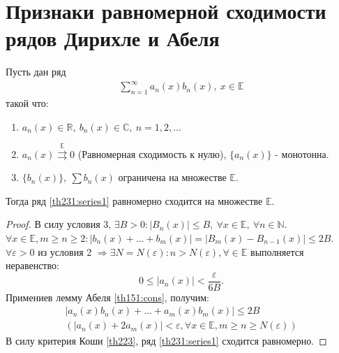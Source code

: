 \section{Признаки равномерной сходимости рядов Дирихле и Абеля}
\begin{theorem}
  Пусть дан ряд
  \begin{gather}
    \sum\limits_{n = 1}^{\infty} a_n(x) b_n(x), \ x \in \mathbb{E} \label{th231:series1}
  \end{gather}
  такой что:
  \begin{enumerate}
    \item $a_n(x) \in \mathbb{R}, \ b_n(x) \in \mathbb{C}, \ n = 1, 2, \dots$
    \item $a_n(x) \stackrel{\mathrm{\mathbb{E}}}{\rightrightarrows} 0$
      (Равномерная сходимость к нулю), $\{a_n(x)\}$ - монотонна.
    \item $\{b_n(x)\}, \ \sum b_n(x)$ ограничена на множестве $\mathbb{E}$.
  \end{enumerate}
  Тогда ряд \ref{th231:series1} равномерно сходится на множестве $\mathbb{E}$.
\end{theorem}

\begin{proof}
  В силу условия 3, $\exists B > 0: |B_n(x)| \leq B, \ \forall x \in \mathbb{E}, \
  \forall n \in \mathbb{N}$. \\
  $\forall x \in \mathbb{E}, m \geq n \geq 2: |b_n(x) + \dots + b_m(x)| =
  |B_m(x) - B_{n-1}(x)| \leq 2B$. \\
  $\forall \varepsilon > 0$ из условия 2 $\Rightarrow \exists N = N(\varepsilon):
  n > N(\varepsilon), \forall \in \mathbb{E}$ выполняется неравенство:
  $$0 \leq |a_n(x)| < \frac{\varepsilon}{6B}.$$
  Примениев лемму Абеля \ref{th151:cons}, получим:
  \begin{gather*}
    |a_n(x) b_n(x) + \dots + a_m(x) b_m(x)| \leq 2B \\
    (|a_n(x) + 2a_m(x)| < \varepsilon, \forall x \in \mathbb{E},
    m \geq n \geq N(\varepsilon))
  \end{gather*}
  В силу критерия Коши \ref{th223}, ряд \ref{th231:series1} сходится равномерно.
\end{proof}

